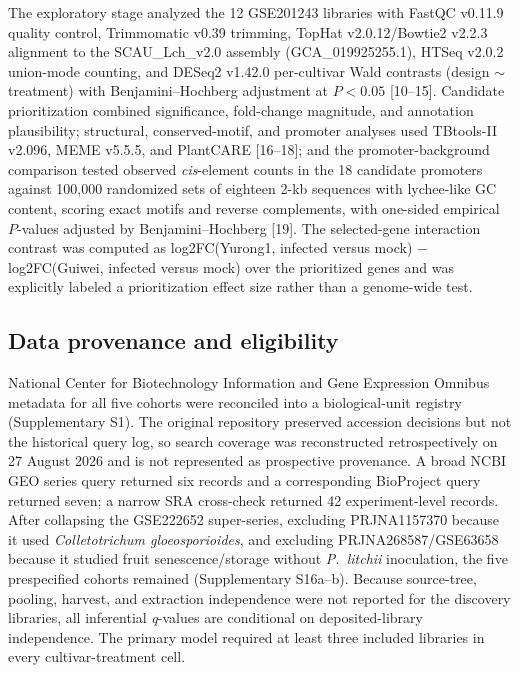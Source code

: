 \documentclass[11pt]{article}
\newcommand{\Pl}{\textit{P.~litchii}}
\newcommand{\q}{\textit{q}}
\begin{document}
The exploratory stage analyzed the 12 GSE201243 libraries with FastQC v0.11.9 quality control, Trimmomatic v0.39 trimming, TopHat v2.0.12/Bowtie2 v2.2.3 alignment to the SCAU\_Lch\_v2.0 assembly (GCA\_019925255.1), HTSeq v2.0.2 union-mode counting, and DESeq2 v1.42.0 per-cultivar Wald contrasts (design $\sim$ treatment) with Benjamini--Hochberg adjustment at $P<0.05$ [10--15]. Candidate prioritization combined significance, fold-change magnitude, and annotation plausibility; structural, conserved-motif, and promoter analyses used TBtools-II v2.096, MEME v5.5.5, and PlantCARE [16--18]; and the promoter-background comparison tested observed \textit{cis}-element counts in the 18 candidate promoters against 100,000 randomized sets of eighteen 2-kb sequences with lychee-like GC content, scoring exact motifs and reverse complements, with one-sided empirical $P$-values adjusted by Benjamini--Hochberg [19]. The selected-gene interaction contrast was computed as log2FC(Yurong1, infected versus mock) $-$ log2FC(Guiwei, infected versus mock) over the prioritized genes and was explicitly labeled a prioritization effect size rather than a genome-wide test.

\subsection{Data provenance and eligibility}

National Center for Biotechnology Information and Gene Expression Omnibus metadata for all five cohorts were reconciled into a biological-unit registry (Supplementary S1). The original repository preserved accession decisions but not the historical query log, so search coverage was reconstructed retrospectively on 27 August 2026 and is not represented as prospective provenance. A broad NCBI GEO series query returned six records and a corresponding BioProject query returned seven; a narrow SRA cross-check returned 42 experiment-level records. After collapsing the GSE222652 super-series, excluding PRJNA1157370 because it used \textit{Colletotrichum gloeosporioides}, and excluding PRJNA268587/GSE63658 because it studied fruit senescence/storage without \Pl{} inoculation, the five prespecified cohorts remained (Supplementary S16a--b). Because source-tree, pooling, harvest, and extraction independence were not reported for the discovery libraries, all inferential \q-values are conditional on deposited-library independence. The primary model required at least three included libraries in every cultivar-treatment cell.
\end{document}
